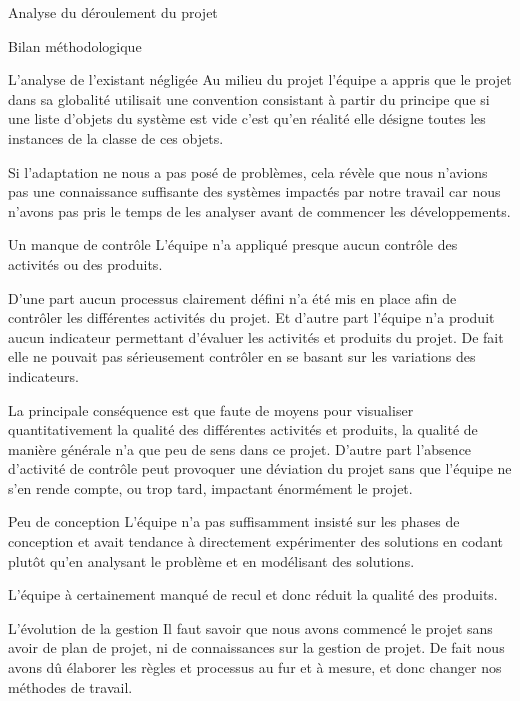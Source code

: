 \documentclass[]{article}
\begin{document}
{\begin{section}{Analyse du déroulement du projet}
\newpage

 \begin{subsection}{Bilan méthodologique}
     \begin{subsubsection}{L'analyse de l'existant négligée}
         Au milieu du projet l'équipe a appris que le projet dans sa globalité utilisait une convention consistant à partir du principe que si une liste d'objets du système est vide c'est qu'en réalité elle désigne toutes les instances de la classe de ces objets.

         Si l'adaptation ne nous a pas posé de problèmes, cela révèle que nous n'avions pas une connaissance suffisante des systèmes impactés par notre travail car nous n'avons pas pris le temps de les analyser avant de commencer les développements.
     \end{subsubsection}

     \begin{subsubsection}{Un manque de contrôle}
         L'équipe n'a appliqué presque aucun contrôle des activités ou des produits.

         D'une part aucun processus clairement défini n'a été mis en place afin de contrôler les différentes activités du projet. Et d'autre part l'équipe n'a produit aucun indicateur permettant d'évaluer les activités et produits du projet. De fait elle ne pouvait pas sérieusement contrôler en se basant sur les variations des indicateurs.

         La principale conséquence est que faute de moyens pour visualiser quantitativement la qualité des différentes activités et produits, la qualité de manière générale n'a que peu de sens dans ce projet. D'autre part l'absence d'activité de contrôle peut provoquer une déviation du projet sans que l'équipe ne s'en rende compte, ou trop tard, impactant énormément le projet.
     \end{subsubsection}

     \begin{subsubsection}{Peu de conception}
         L'équipe n'a pas suffisamment insisté sur les phases de conception et avait tendance à directement expérimenter des solutions en codant plutôt qu'en analysant le problème et en modélisant des solutions.

         L'équipe à certainement manqué de recul et donc réduit la qualité des produits.
     \end{subsubsection}

     \begin{subsubsection}{L'évolution de la gestion}
         Il faut savoir que nous avons commencé le projet sans avoir de plan de projet, ni de connaissances sur la gestion de projet. De fait nous avons dû élaborer les règles et processus au fur et à mesure, et donc changer nos méthodes de travail.


\end{subsubsection}
\end{subsection}
\end{section}}
\end{document}
